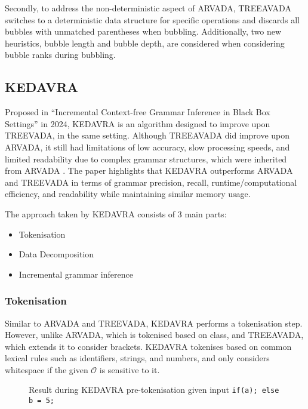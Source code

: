 Secondly, to address the non-deterministic aspect of ARVADA, TREEAVADA switches to a deterministic data structure for specific operations and discards all bubbles with unmatched parentheses when bubbling. Additionally, two new heuristics, bubble length and bubble depth, are considered when considering bubble ranks during bubbling.

\subsection{KEDAVRA}

Proposed in \enquote{Incremental Context-free Grammar Inference in Black Box
Settings} \cite{liIncrementalContextfreeGrammar2024} in 2024, KEDAVRA is an algorithm designed to improve upon TREEVADA, in the same setting. Although TREEAVADA did improve upon ARVADA, it still had limitations of low accuracy, slow processing speeds, and limited readability due to complex grammar structures, which were inherited from ARVADA \cite{liIncrementalContextfreeGrammar2024,kulkarniLearningHighlyRecursive2021}. 
The paper highlights that KEDAVRA outperforms ARVADA and TREEVADA in terms of grammar precision, recall, runtime/computational efficiency, and readability while maintaining similar memory usage.

\vspace{\baselineskip}
The approach taken by KEDAVRA consists of 3 main parts:
\begin{itemize}
    \item Tokenisation
    \item Data Decomposition
    \item Incremental grammar inference
\end{itemize}

\subsubsection{Tokenisation}
Similar to ARVADA and TREEVADA, KEDAVRA performs a tokenisation step. However, unlike ARVADA, which is tokenised based on class, and TREEAVADA, which extends it to consider brackets. KEDAVRA tokenises based on common lexical rules such as identifiers, strings, and numbers, and only considers whitespace if the given $\mathcal{O}$ is sensitive to it. 

\begin{figure}[h!]
\centering
{}
\caption{Result during KEDAVRA pre-tokenisation given input \texttt{if(a); else b = 5;}}
\label{fig:pre-tokenising KEDAVRA}
\end{figure}


